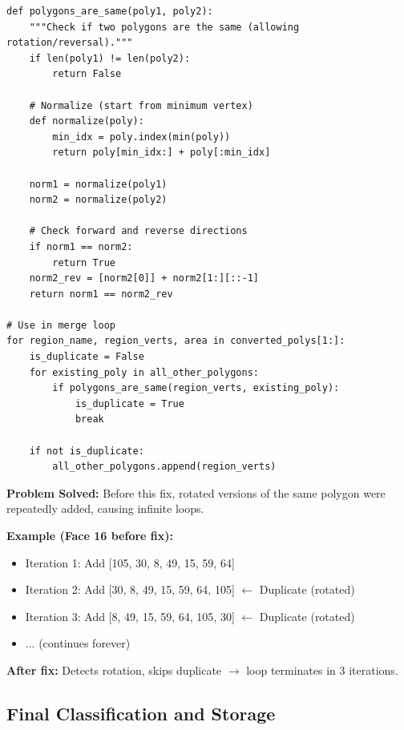 \documentclass[11pt]{article}
\begin{document}
\begin{lstlisting}[caption={Preventing infinite loops through duplicate detection},label={lst:duplicate}]
def polygons_are_same(poly1, poly2):
    """Check if two polygons are the same (allowing rotation/reversal)."""
    if len(poly1) != len(poly2):
        return False
    
    # Normalize (start from minimum vertex)
    def normalize(poly):
        min_idx = poly.index(min(poly))
        return poly[min_idx:] + poly[:min_idx]
    
    norm1 = normalize(poly1)
    norm2 = normalize(poly2)
    
    # Check forward and reverse directions
    if norm1 == norm2:
        return True
    norm2_rev = [norm2[0]] + norm2[1:][::-1]
    return norm1 == norm2_rev

# Use in merge loop
for region_name, region_verts, area in converted_polys[1:]:
    is_duplicate = False
    for existing_poly in all_other_polygons:
        if polygons_are_same(region_verts, existing_poly):
            is_duplicate = True
            break
    
    if not is_duplicate:
        all_other_polygons.append(region_verts)
\end{lstlisting}

\textbf{Problem Solved:} Before this fix, rotated versions of the same polygon were repeatedly added, causing infinite loops.

\textbf{Example (Face 16 before fix):}
\begin{itemize}
    \item Iteration 1: Add [105, 30, 8, 49, 15, 59, 64]
    \item Iteration 2: Add [30, 8, 49, 15, 59, 64, 105] $\leftarrow$ Duplicate (rotated)
    \item Iteration 3: Add [8, 49, 15, 59, 64, 105, 30] $\leftarrow$ Duplicate (rotated)
    \item ... (continues forever)
\end{itemize}

\textbf{After fix:} Detects rotation, skips duplicate $\rightarrow$ loop terminates in 3 iterations.

\subsection{Final Classification and Storage}
\end{document}
